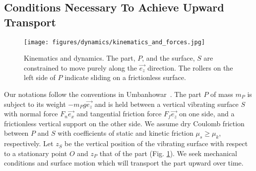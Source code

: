 

\subsection{Conditions Necessary To Achieve Upward Transport}

\begin{figure}[t]
    \centering
    \texttt{[image: figures/dynamics/kinematics\_and\_forces.jpg]}
    \caption{Kinematics and dynamics.
    The part, $P$, and the surface, $S$ are constrained to move purely along the $\Vec{e_z}$ direction.
    The rollers on the left side of $P$ indicate sliding on a frictionless surface.
    }
    \label{figure: kinematics and dynamics}
    \vspace{\shift}
\end{figure}

Our notations follow the conventions in Umbanhowar~\cite{umbanhowar2008optimal}. The part $P$ of mass $m_P$ is subject to its weight $-m_P g \Vec{e_z}$ and is held between a vertical vibrating surface $S$ with normal force $F_n \Vec{e_x}$ and tangential friction force $F_f \Vec{e_z}$ on one side, and a frictionless vertical support on the other side.
%
We assume dry Coulomb friction between $P$ and $S$ with coefficients of static and kinetic friction  $\mu_s \geq \mu_k$, respectively.
%
Let $z_S$ be the vertical position of the vibrating surface with respect to a stationary point $O$ and $z_P$ that of the part (Fig. \ref{figure: kinematics and dynamics}). We seek mechanical conditions and surface motion which will transport the part upward over time.

